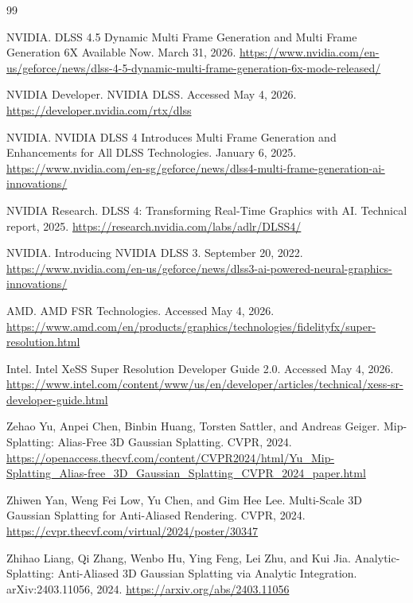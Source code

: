 \documentclass[11pt]{article}
\begin{document}
\begin{thebibliography}{99}

NVIDIA.
\newblock DLSS 4.5 Dynamic Multi Frame Generation and Multi Frame Generation
6X Available Now.
\newblock March 31, 2026.
\newblock \url{https://www.nvidia.com/en-us/geforce/news/dlss-4-5-dynamic-multi-frame-generation-6x-mode-released/}

NVIDIA Developer.
\newblock NVIDIA DLSS.
\newblock Accessed May 4, 2026.
\newblock \url{https://developer.nvidia.com/rtx/dlss}

NVIDIA.
\newblock NVIDIA DLSS 4 Introduces Multi Frame Generation and Enhancements for
All DLSS Technologies.
\newblock January 6, 2025.
\newblock \url{https://www.nvidia.com/en-sg/geforce/news/dlss4-multi-frame-generation-ai-innovations/}

NVIDIA Research.
\newblock DLSS 4: Transforming Real-Time Graphics with AI.
\newblock Technical report, 2025.
\newblock \url{https://research.nvidia.com/labs/adlr/DLSS4/}

NVIDIA.
\newblock Introducing NVIDIA DLSS 3.
\newblock September 20, 2022.
\newblock \url{https://www.nvidia.com/en-us/geforce/news/dlss3-ai-powered-neural-graphics-innovations/}

AMD.
\newblock AMD FSR Technologies.
\newblock Accessed May 4, 2026.
\newblock \url{https://www.amd.com/en/products/graphics/technologies/fidelityfx/super-resolution.html}

Intel.
\newblock Intel XeSS Super Resolution Developer Guide 2.0.
\newblock Accessed May 4, 2026.
\newblock \url{https://www.intel.com/content/www/us/en/developer/articles/technical/xess-sr-developer-guide.html}

Zehao Yu, Anpei Chen, Binbin Huang, Torsten Sattler, and Andreas Geiger.
\newblock Mip-Splatting: Alias-Free 3D Gaussian Splatting.
\newblock CVPR, 2024.
\newblock \url{https://openaccess.thecvf.com/content/CVPR2024/html/Yu_Mip-Splatting_Alias-free_3D_Gaussian_Splatting_CVPR_2024_paper.html}

Zhiwen Yan, Weng Fei Low, Yu Chen, and Gim Hee Lee.
\newblock Multi-Scale 3D Gaussian Splatting for Anti-Aliased Rendering.
\newblock CVPR, 2024.
\newblock \url{https://cvpr.thecvf.com/virtual/2024/poster/30347}

Zhihao Liang, Qi Zhang, Wenbo Hu, Ying Feng, Lei Zhu, and Kui Jia.
\newblock Analytic-Splatting: Anti-Aliased 3D Gaussian Splatting via Analytic
Integration.
\newblock arXiv:2403.11056, 2024.
\newblock \url{https://arxiv.org/abs/2403.11056}


\end{thebibliography}
\end{document}
